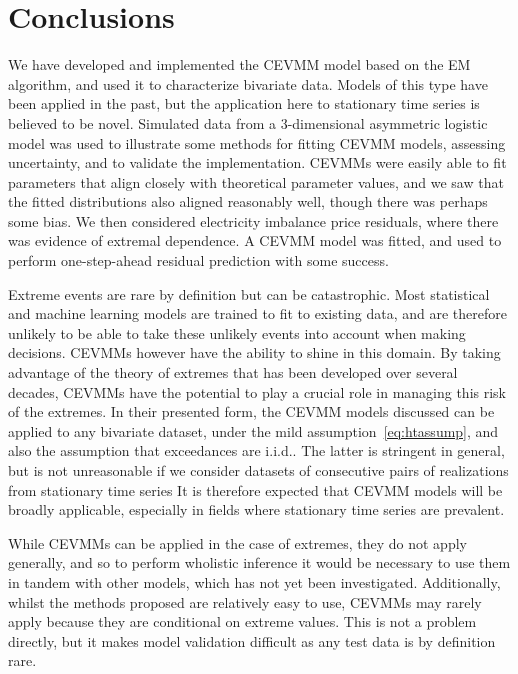 \documentclass[11pt,twoside,openany]{book}
\numberwithin{Theorem}{chapter}
\numberwithin{Definition}{chapter}
\numberwithin{Lemma}{chapter}
\numberwithin{Algorithm}{chapter}
\numberwithin{equation}{chapter}
\begin{document}
\chapter{Conclusions}

We have developed and implemented the CEVMM model based on the EM algorithm,
and used it to characterize bivariate data. Models of this type have been
applied in the past, but the application here to stationary time series is
believed to be novel. Simulated data from a 3-dimensional asymmetric logistic
model was used to illustrate some methods for fitting CEVMM models, assessing
uncertainty, and to validate the implementation. CEVMMs were
easily able to fit parameters that align closely with theoretical parameter values,
and we saw that the fitted distributions also aligned reasonably well, though
there was perhaps some bias.
We then considered electricity
imbalance price residuals, where there was evidence of extremal dependence. A
CEVMM model was fitted, and used to perform one-step-ahead residual prediction
with some success.

Extreme events are rare by definition but can be catastrophic. Most statistical
and machine learning models are trained to fit to existing data, and are
therefore unlikely to be able to take these unlikely events into account
when making decisions.
CEVMMs however have the ability to shine in this domain.
By taking advantage of the theory of extremes that has been
developed over several decades, CEVMMs have the potential
to play a crucial role in managing this risk of the extremes.
In their presented form, the CEVMM models discussed can be applied to any
bivariate dataset, under the mild assumption~\eqref{eq:htassump},
and also the assumption that exceedances are i.i.d.. The latter
is stringent in general, but is not unreasonable if we consider
datasets of consecutive pairs of realizations from stationary time series It is
therefore expected
that CEVMM models will be broadly applicable, especially in fields
where stationary time series are prevalent.

While CEVMMs can be applied in the case of extremes, they
do not apply generally, and so to perform wholistic inference
it would be necessary to use them in tandem with other models,
which has not yet been investigated.
Additionally, whilst the methods proposed are relatively easy
to use, CEVMMs may rarely apply because they
are conditional on extreme values. This is not a problem directly,
but it makes model validation difficult as any test data is by definition
rare.
\end{document}

